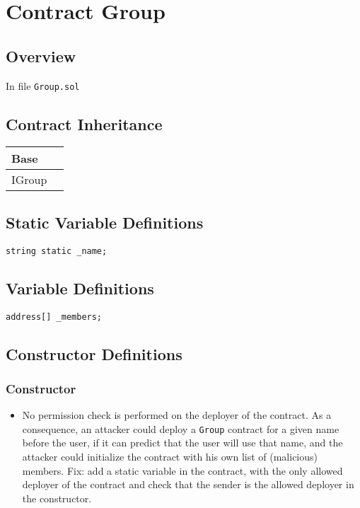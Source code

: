 
\chapter{Contract Group}

\minitoc

\section{Overview}

In file {\tt Group.sol}

\section{Contract Inheritance}

\noindent\begin{tabular}{|l|p{5cm}|}\hline
Base & \\\hline
IGroup & \\\hline
\end{tabular}


\section{Static Variable Definitions}

\begin{lstlisting}[firstnumber=11]
    string static _name;
\end{lstlisting}

\section{Variable Definitions}

\begin{lstlisting}[firstnumber=12]
    address[] _members;
\end{lstlisting}

\section{Constructor Definitions}

\subsection{Constructor}

\begin{itemize}
\item {}
  {No permission check is performed on the deployer of the contract.
    As a consequence, an attacker could deploy a {\tt Group} contract
    for a given name before the user, if it can predict that the user
    will use that name, and the attacker could initialize the contract
    with his own list of (malicious) members. Fix: add a static
    variable in the contract, with the only allowed deployer of the
    contract and check that the sender is the allowed deployer in the
    constructor. }
\end{itemize}

